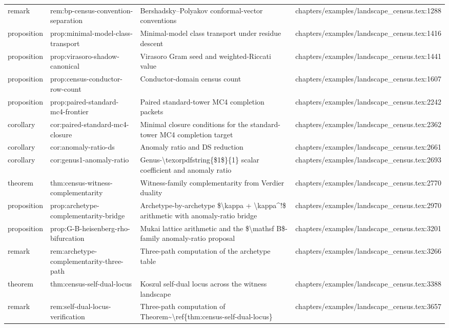 \documentclass[11pt]{article}
\begin{document}
\begin{longtable}{L{0.10\textwidth}L{0.26\textwidth}L{0.42\textwidth}L{0.22\textwidth}}
remark & rem:bp-census-convention-separation & Bershadsky--Polyakov conformal-vector conventions & chapters/examples/landscape\_census.tex:1288\\
proposition & prop:minimal-model-class-transport & Minimal-model class transport under residue descent & chapters/examples/landscape\_census.tex:1416\\
proposition & prop:virasoro-shadow-canonical & Virasoro Gram seed and weighted-Riccati value & chapters/examples/landscape\_census.tex:1441\\
proposition & prop:census-conductor-row-count & Conductor-domain census count & chapters/examples/landscape\_census.tex:1607\\
proposition & prop:paired-standard-mc4-frontier & Paired standard-tower MC4 completion packets & chapters/examples/landscape\_census.tex:2242\\
corollary & cor:paired-standard-mc4-closure & Minimal closure conditions for the standard-tower MC4 completion target & chapters/examples/landscape\_census.tex:2362\\
corollary & cor:anomaly-ratio-ds & Anomaly ratio and DS reduction & chapters/examples/landscape\_census.tex:2661\\
corollary & cor:genus1-anomaly-ratio & Genus-\textbackslash{}texorpdfstring\{\$1\$\}\{1\} scalar coefficient and anomaly ratio & chapters/examples/landscape\_census.tex:2693\\
theorem & thm:census-witness-complementarity & Witness-family complementarity from Verdier duality & chapters/examples/landscape\_census.tex:2770\\
proposition & prop:archetype-complementarity-bridge & Archetype-by-archetype \$\textbackslash{}kappa + \textbackslash{}kappa\textasciicircum{}!\$ arithmetic with anomaly-ratio bridge & chapters/examples/landscape\_census.tex:2970\\
proposition & prop:G-B-heisenberg-rho-bifurcation & Mukai lattice arithmetic and the \$\textbackslash{}mathsf B\$-family anomaly-ratio proposal & chapters/examples/landscape\_census.tex:3201\\
remark & rem:archetype-complementarity-three-path & Three-path computation of the archetype table & chapters/examples/landscape\_census.tex:3266\\
theorem & thm:census-self-dual-locus & Koszul self-dual locus across the witness landscape & chapters/examples/landscape\_census.tex:3388\\
remark & rem:self-dual-locus-verification & Three-path computation of Theorem\textasciitilde{}\textbackslash{}ref\{thm:census-self-dual-locus\} & chapters/examples/landscape\_census.tex:3657\\

\end{longtable}
\end{document}
